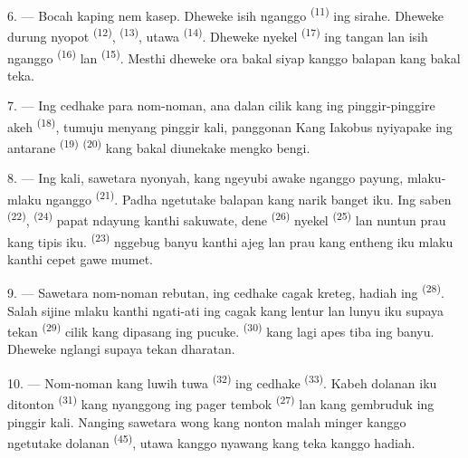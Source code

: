 6. --- Bocah kaping nem kasep. Dheweke isih nganggo 
\textsuperscript{(11)} ing sirahe. Dheweke durung nyopot
 \textsuperscript{(12)}, 
\textsuperscript{(13)}, utawa  \textsuperscript{(14)}.
Dheweke nyekel  \textsuperscript{(17)} ing tangan lan
isih nganggo  \textsuperscript{(16)} lan
 \textsuperscript{(15)}. Mesthi dheweke ora bakal
siyap kanggo balapan kang bakal teka.

7. --- Ing cedhake para nom-noman, ana dalan cilik kang ing
pinggir-pinggire akeh  \textsuperscript{(18)},
tumuju menyang pinggir kali, panggonan Kang Iakobus nyiyapake
ing antarane  \textsuperscript{(19)} 
\textsuperscript{(20)} kang bakal diunekake mengko bengi.

\VUsaut{4.4mm}
\VUsaut{3.4mm}

8. --- Ing kali, sawetara nyonyah, kang ngeyubi awake nganggo payung,
mlaku-mlaku nganggo  \textsuperscript{(21)}. Padha ngetutake
balapan kang narik banget iku. Ing saben 
\textsuperscript{(22)},  \textsuperscript{(24)}
papat ndayung kanthi sakuwate, dene 
\textsuperscript{(26)} nyekel  \textsuperscript{(25)}
lan nuntun prau kang tipis iku.  \textsuperscript{(23)}
nggebug banyu kanthi ajeg lan prau kang entheng iku mlaku kanthi
cepet gawe mumet.

9. --- Sawetara nom-noman rebutan, ing cedhake cagak kreteg, hadiah
ing  \textsuperscript{(28)}. Salah sijine mlaku
kanthi ngati-ati ing cagak kang lentur lan lunyu iku supaya tekan
 \textsuperscript{(29)} cilik kang dipasang ing
pucuke.  \textsuperscript{(30)} kang lagi apes tiba
ing banyu. Dheweke nglangi supaya tekan dharatan.

10. --- Nom-noman kang luwih tuwa 
\textsuperscript{(32)} ing cedhake 
\textsuperscript{(33)}. Kabeh dolanan iku ditonton 
\textsuperscript{(31)} kang nyanggong ing pager tembok
 \textsuperscript{(27)} lan kang gembruduk ing pinggir
kali. Nanging sawetara wong kang nonton malah minger kanggo ngetutake
dolanan  \textsuperscript{(45)}, utawa kanggo
nyawang  kang teka kanggo 
hadiah.

